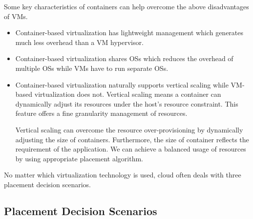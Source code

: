 Some key characteristics of containers can help overcome the above disadvantages of VMs.
\begin{itemize}
	The following two characteristics can overcome the heavy overhead of VM hypervisors and reduce the redundant OSs.
	\item Container-based virtualization has lightweight management which generates much less overhead than a VM hypervisor. 
	\item Container-based virtualization shares OSs which reduces the overhead of multiple OSs while VMs have to run separate OSs.

	\item Container-based virtualization naturally supports vertical scaling while VM-based virtualization does not. Vertical scaling means a container can dynamically adjust its resources under the host's resource constraint. This feature offers a fine granularity management of resources. 

	Vertical scaling can overcome the resource over-provisioning by dynamically adjusting the size of containers. Furthermore, the size of container reflects the requirement of the application. We can achieve a balanced usage of resources by using appropriate placement algorithm.

\end{itemize}



 No matter which virtualization technology is used, cloud often deals with three placement decision scenarios. 




\subsection{Placement Decision Scenarios}
\label{sec:scenarios}

